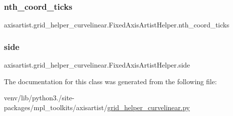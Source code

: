 \subsubsection{\texorpdfstring{nth\+\_\+coord\+\_\+ticks}{nth\_coord\_ticks}}
{\footnotesize\ttfamily axisartist.\+grid\+\_\+helper\+\_\+curvelinear.\+Fixed\+Axis\+Artist\+Helper.\+nth\+\_\+coord\+\_\+ticks}

\mbox{\label{classaxisartist_1_1grid__helper__curvelinear_1_1FixedAxisArtistHelper_a993729176beb8e77751ac53bd1ef38b4}} 
\subsubsection{\texorpdfstring{side}{side}}
{\footnotesize\ttfamily axisartist.\+grid\+\_\+helper\+\_\+curvelinear.\+Fixed\+Axis\+Artist\+Helper.\+side}



The documentation for this class was generated from the following file\+:\begin{DoxyCompactItemize}
\item 
venv/lib/python3./site-\/packages/mpl\+\_\+toolkits/axisartist/\hyperlink{axisartist_2grid__helper__curvelinear_8py}{grid\+\_\+helper\+\_\+curvelinear.\+py}\end{DoxyCompactItemize}
